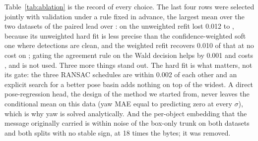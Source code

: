 Table~\ref{tab:ablation} is the record of every choice. The last four rows were selected jointly with \opvv validation under a rule fixed in advance, the largest mean over the two datasets of the paired lead over \freealign: on \opvv the unweighted refit lost 0.012 to \freealign, because its unweighted hard fit is less precise than the confidence-weighted soft one where detections are clean, and the weighted refit recovers 0.010 of that at no cost on \vxreal; gating the agreement rule on the Wald decision helps \opvv by 0.001 and costs , and is not used. Three more things stand out. The hard fit is what matters, not its gate: the three RANSAC schedules are within 0.002 of each other and an explicit search for a better pose basin adds nothing on top of the widest. A direct pose-regression head, the design of the method we started from, never leaves the conditional mean on this data (yaw MAE equal to predicting zero at every $\sigma$), which is why yaw is solved analytically. And the per-object embedding that the message originally carried is within noise of the box-only trunk on both datasets and both splits with no stable sign, at 18 times the bytes; it was removed.

